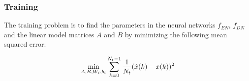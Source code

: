 \documentclass[10pt]{article}
\begin{document}
\subsubsection{Training}
The training problem is to find the parameters in the neural networks
$f_{EN}$, $f_{DN}$ and the linear model matrices $A$ and $B$ by minimizing the following mean squared error:

\begin{align*}
  \underset{A, B, W_i, b_i}{\textnormal{min}} \sum_{k=0}^{N_t-1} 
  \dfrac{1}{N_t}(\hat{x}(k) - x(k))^2
\end{align*}
\end{document}

